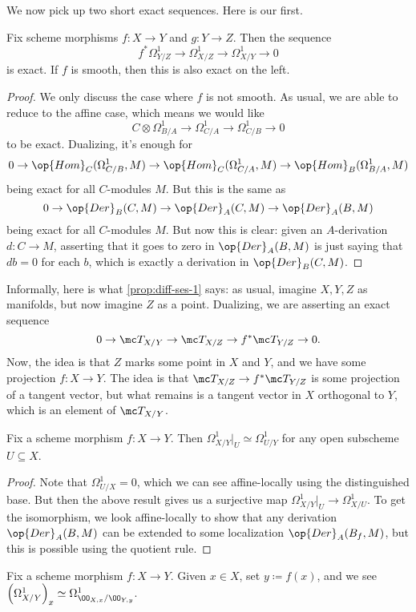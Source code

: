 \documentclass[../notes.tex]{subfiles}
\begin{document}
We now pick up two short exact sequences. Here is our first.
\begin{proposition} \label{prop:diff-ses-1}
	Fix scheme morphisms $f\colon X\to Y$ and $g\colon Y\to Z$. Then the sequence
	\[f^*\Omega^1_{Y/Z}\to\Omega^1_{X/Z}\to\Omega^1_{X/Y}\to0\]
	is exact. If $f$ is smooth, then this is also exact on the left.
\end{proposition}
\begin{proof}
	We only discuss the case where $f$ is not smooth. As usual, we are able to reduce to the affine case, which means we would like
	\[C\otimes\Omega^1_{B/A}\to\Omega^1_{C/A}\to\Omega^1_{C/B}\to0\]
	to be exact. Dualizing, it's enough for
	\[0\to\op{Hom}_C(\Omega^1_{C/B},M)\to\op{Hom}_C(\Omega^1_{C/A},M)\to\op{Hom}_B(\Omega^1_{B/A},M)\]
	being exact for all $C$-modules $M$. But this is the same as
	\[0\to\op{Der}_B(C,M)\to\op{Der}_A(C,M)\to\op{Der}_A(B,M)\]
	being exact for all $C$-modules $M$. But now this is clear: given an $A$-derivation $d\colon C\to M$, asserting that it goes to zero in $\op{Der}_A(B,M)$ is just saying that $db=0$ for each $b$, which is exactly a derivation in $\op{Der}_B(C,M)$.
\end{proof}
\begin{remark}
	Informally, here is what \autoref{prop:diff-ses-1} says: as usual, imagine $X,Y,Z$ as manifolds, but now imagine $Z$ as a point. Dualizing, we are asserting an exact sequence
	\[0\to\mc T_{X/Y}\to\mc T_{X/Z}\to f^*\mc T_{Y/Z}\to0.\]
	Now, the idea is that $Z$ marks some point in $X$ and $Y$, and we have some projection $f\colon X\to Y$. The idea is that $\mc T_{X/Z}\to f^*\mc T_{Y/Z}$ is some projection of a tangent vector, but what remains is a tangent vector in $X$ orthogonal to $Y$, which is an element of $\mc T_{X/Y}$.
\end{remark}
\begin{corollary}
	Fix a scheme morphism $f\colon X\to Y$. Then $\Omega^1_{X/Y}|_U\simeq\Omega^1_{U/Y}$ for any open subscheme $U\subseteq X$.
\end{corollary}
\begin{proof}
	Note that $\Omega^1_{U/X}=0$, which we can see affine-locally using the distinguished base. But then the above result gives us a surjective map $\Omega^1_{X/Y}|_U\to\Omega^1_{X/U}$. To get the isomorphism, we look affine-locally to show that any derivation $\op{Der}_A(B,M)$ can be extended to some localization $\op{Der}_A(B_f,M)$, but this is possible using the quotient rule.
\end{proof}
\begin{corollary}
	Fix a scheme morphism $f\colon X\to Y$. Given $x\in X$, set $y\coloneqq f(x)$, and we see $\left(\Omega^1_{X/Y}\right)_x\simeq\Omega^1_{\OO_{X,x}/\OO_{Y,y}}$.
\end{corollary}
\end{document}

